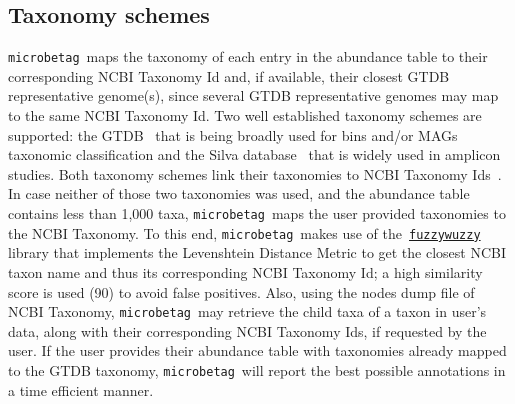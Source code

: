 \documentclass[sn-mathphys,Numbered]{sn-jnl}  %
\theoremstyle{thmstyleone}%
\theoremstyle{thmstyletwo}%
\theoremstyle{thmstylethree}%
\newcommand{\microbetag}{\texttt{microbetag}}
\begin{document}
    \subsection*{Taxonomy schemes}
    \label{subsec:taxonomies}

        \microbetag~maps the taxonomy of each entry in the abundance table to their corresponding NCBI Taxonomy Id and, if available, their closest GTDB representative genome(s), since several GTDB representative genomes may map to the same NCBI Taxonomy Id.
        Two well established taxonomy schemes are supported: the GTDB~\cite{parks2022gtdb} that is being broadly used for bins and/or MAGs taxonomic classification and the Silva database~\cite{quast2012silva} that is widely used in amplicon studies. Both taxonomy schemes link their taxonomies to NCBI Taxonomy Ids~\cite{schoch2020ncbi}.
        In case neither of those two taxonomies was used, and the abundance table contains less than 1,000 taxa, \microbetag~maps the user provided taxonomies to the NCBI Taxonomy. 
        To this end, \microbetag~makes use of the~\href{https://github.com/seatgeek/thefuzz}{\texttt{fuzzywuzzy}} library that implements the Levenshtein Distance Metric to get the closest NCBI taxon name and thus its corresponding NCBI Taxonomy Id; a high similarity score is used (90) to avoid false positives. 
        Also, using the nodes dump file of NCBI Taxonomy, \microbetag~may retrieve the child taxa of a taxon in user's data, along with their corresponding NCBI Taxonomy Ids, if requested by the user.
        If the user provides their abundance table with taxonomies already mapped to the GTDB taxonomy, \microbetag~will report the best possible annotations in a time efficient manner.
        
        
        
\end{document}
